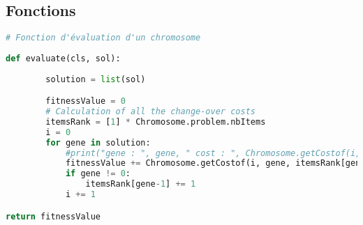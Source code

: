 	\subsection{Fonctions}	
	
	\begin{lstlisting}[language=python]
	# Fonction d'évaluation d'un chromosome
	
def evaluate(cls, sol):
			
		solution = list(sol)

		fitnessValue = 0
		# Calculation of all the change-over costs
		itemsRank = [1] * Chromosome.problem.nbItems
		i = 0
		for gene in solution:
			#print("gene : ", gene, " cost : ", Chromosome.getCostof(i, gene, itemsRank[gene-1], solution))
			fitnessValue += Chromosome.getCostof(i, gene, itemsRank[gene-1], solution)
			if gene != 0:
				itemsRank[gene-1] += 1
			i += 1

return fitnessValue		
    \end{lstlisting}	
	
